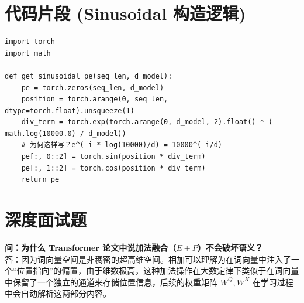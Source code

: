 \documentclass[12pt, a4paper]{article}
\begin{document}
\section{代码片段 (Sinusoidal 构造逻辑)}
\begin{lstlisting}
import torch
import math

def get_sinusoidal_pe(seq_len, d_model):
    pe = torch.zeros(seq_len, d_model)
    position = torch.arange(0, seq_len, dtype=torch.float).unsqueeze(1)
    div_term = torch.exp(torch.arange(0, d_model, 2).float() * (-math.log(10000.0) / d_model))
    # 为何这样写？e^(-i * log(10000)/d) = 10000^(-i/d)
    pe[:, 0::2] = torch.sin(position * div_term)
    pe[:, 1::2] = torch.cos(position * div_term)
    return pe
\end{lstlisting}

\section{深度面试题}
\textbf{问：为什么 Transformer 论文中说加法融合（$E+P$）不会破坏语义？}\\
答：因为词向量空间是非稠密的超高维空间。相加可以理解为在词向量中注入了一个“位置指向”的偏置，由于维数极高，这种加法操作在大数定律下类似于在词向量中保留了一个独立的通道来存储位置信息，后续的权重矩阵 $W^Q, W^K$ 在学习过程中会自动解析这两部分内容。
\end{document}

